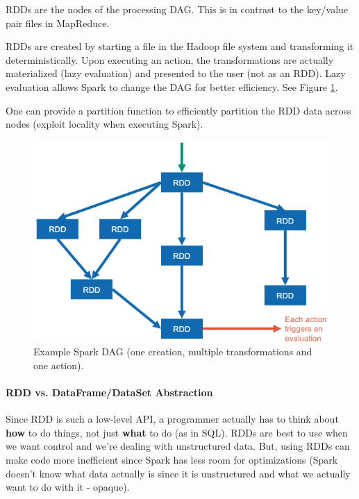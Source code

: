 RDDs are the nodes of the processing DAG. This is in contrast to the key/value pair files in MapReduce.

RDDs are created by starting a file in the Hadoop file system and transforming it deterministically. Upon executing an action, the transformations are actually materialized (lazy evaluation) and presented to the user (not as an RDD). Lazy evaluation allows Spark to change the DAG for better efficiency. See Figure \ref{fig:rdd}.

One can provide a partition function to efficiently partition the RDD data across nodes (exploit locality when executing Spark). %


\begin{figure}[h]
	\centering
	\includegraphics[scale=0.7]{images/4-rdd.PNG}
	\caption{Example Spark DAG (one creation, multiple transformations and one action).}
	\label{fig:rdd}
\end{figure}

\paragraph{RDD vs. DataFrame/DataSet Abstraction}
Since RDD is such a low-level API, a programmer actually has to think about \textbf{how} to do things, not just \textbf{what} to do (as in SQL). RDDs are best to use when we want control and we're dealing with unstructured data. But, using RDDs can make code more inefficient since Spark has less room for optimizations (Spark doesn't know what data actually is since it is unstructured and what we actually want to do with it - opaque).

